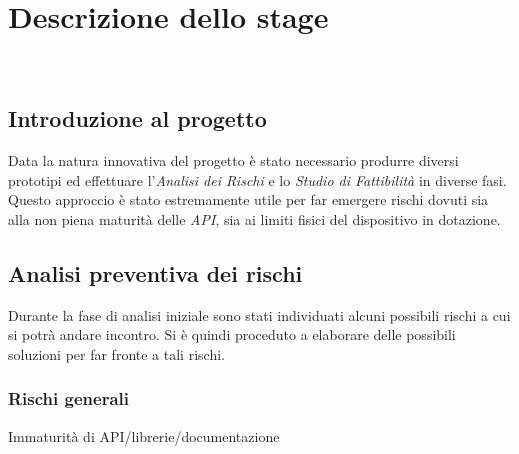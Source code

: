 
\chapter{Descrizione dello stage}
\label{cap:descrizione-stage}

\\

\section{Introduzione al progetto}
Data la natura innovativa del progetto è stato necessario produrre diversi prototipi ed effettuare l'\emph{Analisi dei Rischi} e lo \emph{Studio di Fattibilità} in diverse fasi.\\
Questo approccio è stato estremamente utile per far emergere rischi dovuti sia alla non piena maturità delle \emph{API}, sia ai limiti fisici del dispositivo in dotazione.


\section{Analisi preventiva dei rischi}

Durante la fase di analisi iniziale sono stati individuati alcuni possibili rischi a cui si potrà andare incontro.
Si è quindi proceduto a elaborare delle possibili soluzioni per far fronte a tali rischi.\\

\subsection{Rischi generali}
\begin{risk}{Immaturità di API/librerie/documentazione}
    \label{risk:API-immaturity} 
\end{risk}

